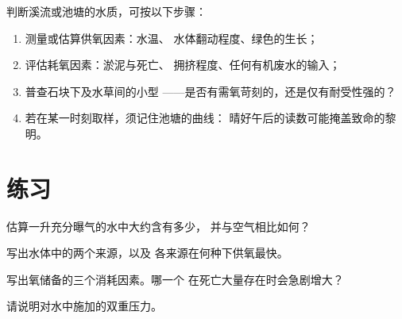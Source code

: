 \begin{method}[判断水体]\label{met:g7:oxygen-in-the-water:judge}
判断溪流或池塘的水质，可按以下步骤：
\begin{enumerate}
  \item 测量或估算供氧因素：水温、
        水体翻动程度、绿色的生长；
  \item 评估耗氧因素：淤泥与死亡、
        拥挤程度、任何有机废水的输入；
  \item 普查石块下及水草间的小型
——是否有需氧苛刻的，还是仅有耐受性强的？
  \item 若在某一时刻取样，须记住池塘的曲线：
        晴好午后的读数可能掩盖致命的黎明。
\end{enumerate}
\end{method}

\section{练习}

\begin{exercise}[$\star$]\label{exo:g7:oxygen-in-the-water:1}
估算一升充分曝气的水中大约含有多少，
并与空气相比如何？
\end{exercise}

\begin{exercise}[$\star$]\label{exo:g7:oxygen-in-the-water:2}
写出水体中的两个来源，以及
各来源在何种下供氧最快。
\end{exercise}

\begin{exercise}[$\star$]\label{exo:g7:oxygen-in-the-water:3}
写出氧储备的三个消耗因素。哪一个
在死亡大量存在时会急剧增大？
\end{exercise}

\begin{exercise}[$\star$]\label{exo:g7:oxygen-in-the-water:4}
请说明对水中施加的双重压力。
\end{exercise}

